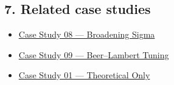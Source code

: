 \documentclass[
  11pt,
]{article}
\providecommand{\tightlist}{
  \setlength{\itemsep}{0pt}\setlength{\parskip}{0pt}}
\begin{document}
\hypertarget{7-related-case-studies}{
\subsection{7. Related case studies}\label{7-related-case-studies}}

\begin{itemize}
\tightlist
\item
  \href{https://github.com/pinarsyt/overlap-calculator/blob/main/case_studies/08_broadening_sigma/README.md}{Case
  Study 08 --- Broadening Sigma}
\item
  \href{https://github.com/pinarsyt/overlap-calculator/blob/main/case_studies/09_beer_lambert_tuning/README.md}{Case
  Study 09 --- Beer--Lambert Tuning}
\item
  \href{https://github.com/pinarsyt/overlap-calculator/blob/main/case_studies/01_theoretical_only/README.md}{Case
  Study 01 --- Theoretical Only}
\end{itemize}
\end{document}
